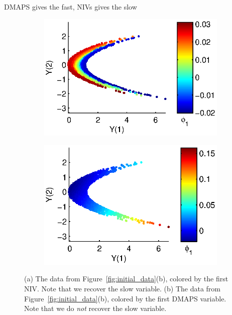 \documentclass[1p]{elsarticle}
\begin{document}
DMAPS gives the fast, NIVs gives the slow 

\begin{figure}[h]
\begin{subfigure}{0.5\textwidth}
\includegraphics[width=\textwidth]{data_transformed_colored_NIV}
\caption{}
\end{subfigure}
\begin{subfigure}{0.5\textwidth}
\includegraphics[width=\textwidth]{data_transformed_colored_DMAPS}
\caption{}
\end{subfigure}
\caption{(a) The data from Figure~\ref{fig:initial_data}(b), colored by the first NIV. Note that we recover the slow variable. (b) The data from Figure~\ref{fig:initial_data}(b), colored by the first DMAPS variable. Note that we do {\em not} recover the slow variable.  }
\label{fig:NIV_versus_DMAPS}
\end{figure}
\end{document}
